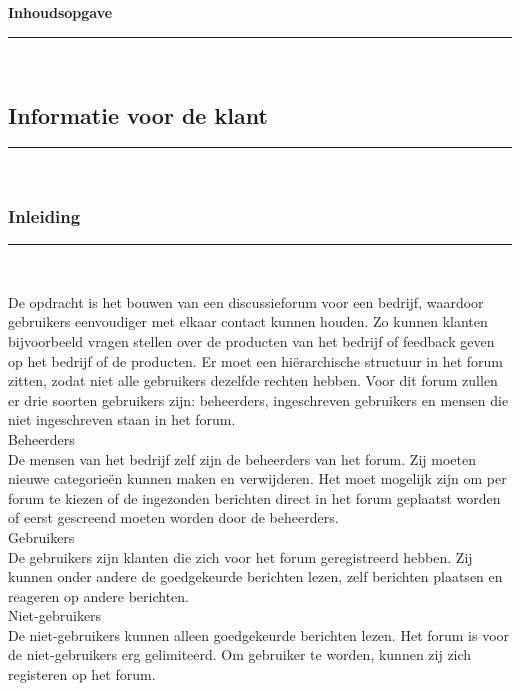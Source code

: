 \documentclass[a4paper,12pt]{article}
\newcommand{\HRule}{\rule{\linewidth}{0.5mm}}
\begin{document}


\newpage
\begin{center}
{ \LARGE \bfseries Inhoudsopgave}
\HRule \\[0.5cm]
\end{center}
\tableofcontents

\newpage
\begin{center}
\part[Informatie voor de klant]{ Informatie voor de klant}
\HRule \\[0.5cm]
\end{center}

\begin{center}
\section[Inleiding]{Inleiding}
\HRule \\[0.5cm]
\end{center}
De opdracht is het bouwen van een discussieforum voor een bedrijf, waardoor gebruikers eenvoudiger met elkaar contact kunnen houden. Zo kunnen klanten bijvoorbeeld vragen stellen over de producten van het bedrijf of feedback geven op het bedrijf of de producten. Er moet een hi\"erarchische structuur in het forum zitten, zodat niet alle gebruikers dezelfde rechten hebben.
Voor dit forum zullen er drie soorten gebruikers zijn: beheerders, ingeschreven gebruikers en mensen die niet ingeschreven staan in het forum.\\

Beheerders\\
De mensen van het bedrijf zelf zijn  de beheerders van het forum. Zij moeten nieuwe categorieën kunnen maken en verwijderen. Het moet mogelijk zijn om per forum te kiezen of de ingezonden berichten direct in het forum geplaatst worden of eerst gescreend moeten worden door de beheerders.\\

Gebruikers\\
De gebruikers zijn klanten die zich voor  het forum geregistreerd hebben. Zij kunnen onder andere de goedgekeurde berichten lezen, zelf berichten plaatsen en reageren op andere berichten. \\

Niet-gebruikers\\
De niet-gebruikers kunnen alleen goedgekeurde berichten lezen. Het forum is voor de niet-gebruikers erg gelimiteerd. Om gebruiker te worden, kunnen zij zich registeren op het forum. \\
\end{document}
